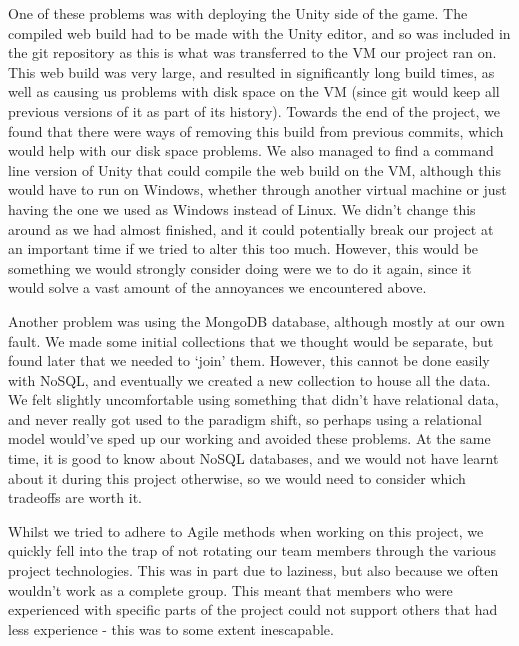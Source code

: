 One of these problems was with deploying the Unity side of the game. The compiled web build had to be made with the Unity editor, and so was included in the git repository as this is what was transferred to the VM our project ran on.  This web build was very large, and resulted in significantly long build times, as well as causing us problems with disk space on the VM (since git would keep all previous versions of it as part of its history). Towards the end of the project, we found that there were ways of removing this build from previous commits, which would help with our disk space problems. We also managed to find a command line version of Unity that could compile the web build on the VM, although this would have to run on Windows, whether through another virtual machine or just having the one we used as Windows instead of Linux. We didn't change this around as we had almost finished, and it could potentially break our project at an important time if we tried to alter this too much. However, this would be something we would strongly consider doing were we to do it again, since it would solve a vast amount of the annoyances we encountered above.

Another problem was using the MongoDB database, although mostly at our own fault. We made some initial collections that we thought would be separate, but found later that we needed to `join' them. However, this cannot be done easily with NoSQL, and eventually we created a new collection to house all the data. We felt slightly uncomfortable using something that didn't have relational data, and never really got used to the paradigm shift, so perhaps using a relational model would've sped up our working and avoided these problems. At the same time, it is good to know about NoSQL databases, and we would not have learnt about it during this project otherwise, so we would need to consider which tradeoffs are worth it.

Whilst we tried to adhere to Agile methods when working on this project, we quickly fell into the trap of not rotating our team members through the various project technologies. This was in part due to laziness, but also because we often wouldn't work as a complete group. This meant that members who were experienced with specific parts of the project could not support others that had less experience - this was to some extent  inescapable.


